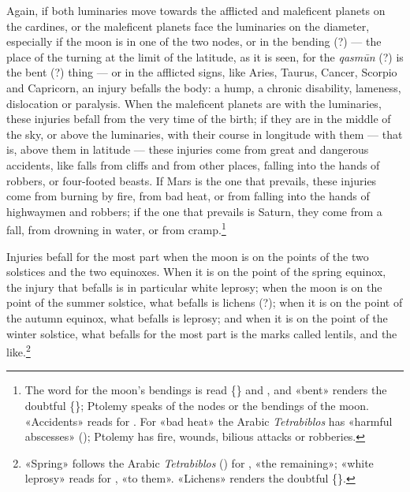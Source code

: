 \documentclass[11pt]{article}
\newcommand{\Fol}[1]{\marginpar{\footnotesize\color{gray}f.\,#1}}
\begin{document}
\par \Fol{54r}Again, if both luminaries move towards the afflicted and maleficent planets on the cardines, or the maleficent planets face the luminaries on the diameter, especially if the moon is in one of the two nodes, or in the bending (?) — the place of the turning at the limit of the latitude, as it is seen, for the \emph{qasmūn} (?) is the bent (?) thing — or in the afflicted signs, like Aries, Taurus, Cancer, Scorpio and Capricorn, an injury befalls the body: a hump, a chronic disability, lameness, dislocation or paralysis. When the maleficent planets are with the luminaries, these injuries befall from the very time of the birth; if they are in the middle of the sky, or above the luminaries, with their course in longitude with them — that is, above them in latitude — these injuries come from great and dangerous accidents, like falls from cliffs and from other places, falling into the hands of robbers, or four-footed beasts. If Mars is the one that prevails, these injuries come from burning by fire, from bad heat, or from falling into the hands of highwaymen and robbers; if the one that prevails is Saturn, they come from a fall, from drowning in water, or from cramp.\footnote{The word for the moon's bendings is read \{\} and , and «bent» renders the doubtful \{\}; Ptolemy speaks of the nodes or the bendings of the moon. «Accidents» reads  for . For «bad heat» the Arabic \emph{Tetrabiblos} has «harmful abscesses» (); Ptolemy has fire, wounds, bilious attacks or robberies.}\par
\par Injuries befall for the most part when the moon is on the points of the two solstices and the two equinoxes. When it is on the point of the spring equinox, the injury that befalls is in particular white leprosy; when the moon is on the point of the summer solstice, what befalls is lichens (?); when it is on the point of the autumn equinox, what befalls is leprosy; and when it is on the point of the winter solstice, what befalls for the most part is the marks called lentils, and the like.\footnote{«Spring» follows the Arabic \emph{Tetrabiblos} () for , «the remaining»; «white leprosy» reads  for , «to them». «Lichens» renders the doubtful \{\}.}\par
\end{document}
